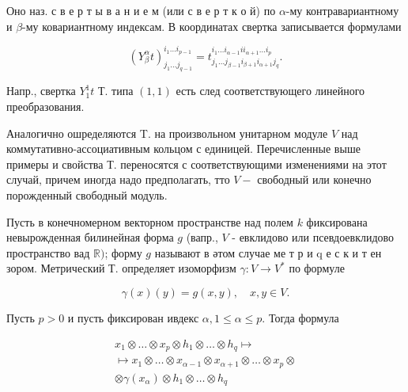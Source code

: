 \documentclass[10pt]{article}
\begin{document}
Оно наз. с в е р т ы в а н и е м (или с в е р т к о й) по $\alpha$-му контравариантному и $\beta$-му ковариантному индексам. В координатах свертка записывается формулами



\[

\left(Y_{\beta}^{\alpha} t\right)_{j_{1} \ldots j_{q-1}}^{i_{1} \ldots i_{p-1}}=t_{j_{1} \ldots j_{\beta-1} i_{\beta+1} i_{\alpha+1} j_{q}}^{i_{1} \ldots i_{\alpha-1} i i_{\alpha+1} \ldots i_{p}} .

\]



Напр., свертка $Y_{1}^{1} t$ Т. типа $(1,1)$ есть след соответствующего линейного преобразования.



Аналогично ошределяются T. на произвольном унитарном модуле $V$ над коммутативно-ассоциативным кольцом с единицей. Перечисленные выше примеры и свойства Т. переносятся с соответствующими изменениями на этот случай, причем иногда надо предполагать, тто $V-$ свободный или конечно порожденный свободный модуль.



Пусть в конечномерном векторном пространстве над полем $k$ фиксирована невырожденная билинейная форма $g$ (вапр., $V$ - евклидово или псевдоевклидово пространство вад $\mathbb{R})$; форму $g$ называют в әтом случае ме т р и q е с к и т ен зором. Метрический Т. определяет изоморфизм $\gamma: V \rightarrow V^{*}$ по формуле



\[

\gamma(x)(y)=g(x, y), \quad x, y \in V .

\]



Пусть $p>0$ и пусть фиксирован ивдекс $\alpha, 1 \leqslant \alpha \leqslant p$. Тогда формула



\[

\begin{gathered}

x_{1} \otimes \ldots \otimes x_{p} \otimes h_{1} \otimes \ldots \otimes h_{q} \mapsto \\

\mapsto x_{1} \otimes \ldots \otimes x_{\alpha-1} \otimes x_{\alpha+1} \otimes \ldots \otimes x_{p} \otimes \\

\otimes \gamma\left(x_{\alpha}\right) \otimes h_{1} \otimes \ldots \otimes h_{q}

\end{gathered}

\]
\end{document}
